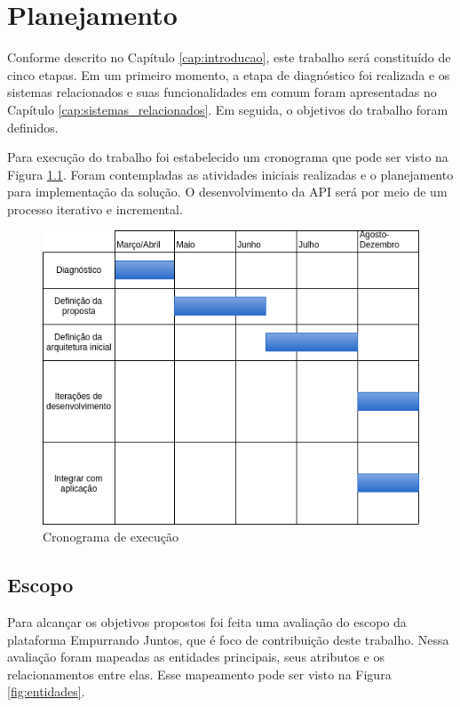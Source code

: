 \chapter{Planejamento}
Conforme descrito no Capítulo \ref{cap:introducao}, este trabalho será constituído de cinco etapas.
Em um primeiro momento, a etapa de diagnóstico foi realizada e os sistemas relacionados e suas funcionalidades em comum foram apresentadas no Capítulo \ref{cap:sistemas_relacionados}. Em seguida, o objetivos do trabalho foram definidos. 

Para execução do trabalho foi estabelecido um cronograma que pode ser visto na Figura \ref{fig:cronograma}.
Foram contempladas as atividades iniciais realizadas e o planejamento para implementação da solução.
O desenvolvimento da API será por meio de um processo iterativo e incremental. 

\begin{figure}[h!]
\centering
\includegraphics[scale=0.6]{figuras/cronograma.png}
\caption{Cronograma de execução}
\label{fig:cronograma}
\end{figure}

\section{Escopo}
Para alcançar os objetivos propostos foi feita uma avaliação do escopo da plataforma Empurrando Juntos, que é foco de contribuição deste trabalho.
Nessa avaliação foram mapeadas as entidades principais, seus atributos e os relacionamentos entre elas. Esse mapeamento pode ser visto na Figura \ref{fig:entidades}.

